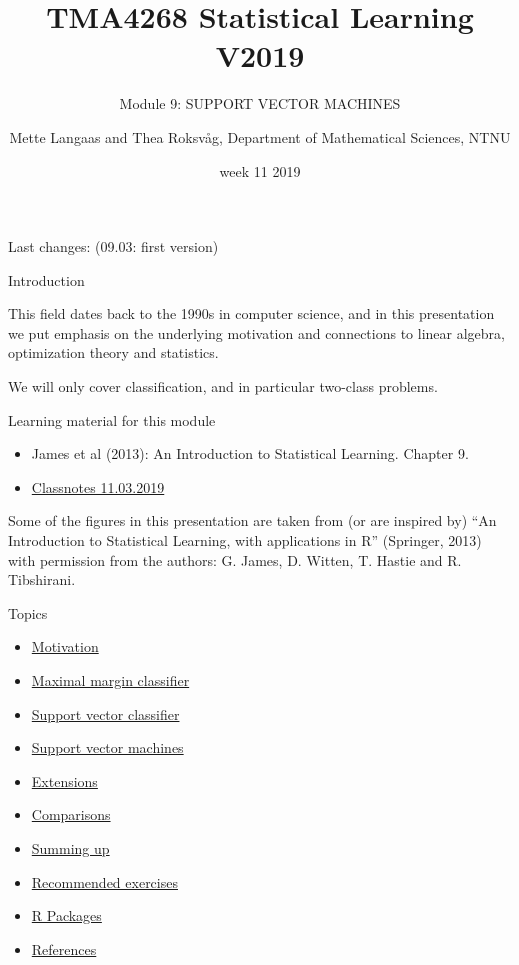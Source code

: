 \documentclass[ignorenonframetext,]{beamer}
\title{TMA4268 Statistical Learning V2019}
\subtitle{Module 9: SUPPORT VECTOR MACHINES}
\author{Mette Langaas and Thea Roksvåg, Department of Mathematical Sciences,
NTNU}
\date{week 11 2019}
\providecommand{\tightlist}{%
  \setlength{\itemsep}{0pt}\setlength{\parskip}{0pt}}
\begin{document}
\frame{\titlepage}

\begin{frame}

Last changes: (09.03: first version)

\end{frame}

\begin{frame}{Introduction}

This field dates back to the 1990s in computer science, and in this
presentation we put emphasis on the underlying motivation and
connections to linear algebra, optimization theory and statistics.

We will only cover classification, and in particular two-class problems.

\begin{block}{Learning material for this module}

\begin{itemize}
\tightlist
\item
  James et al (2013): An Introduction to Statistical Learning. Chapter
  9.\\
\item
  \href{https://www.math.ntnu.no/emner/TMA4268/2019v/notes/M9notes.pdf}{Classnotes
  11.03.2019}
\end{itemize}

Some of the figures in this presentation are taken from (or are inspired
by) ``An Introduction to Statistical Learning, with applications in R''
(Springer, 2013) with permission from the authors: G. James, D. Witten,
T. Hastie and R. Tibshirani.

\end{block}

\end{frame}

\begin{frame}

\begin{block}{Topics}

\begin{itemize}
\tightlist
\item
  \protect\hyperlink{intro}{Motivation}
\item
  \protect\hyperlink{mmc}{Maximal margin classifier}
\item
  \protect\hyperlink{svc}{Support vector classifier}
\item
  \protect\hyperlink{svm}{Support vector machines}
\item
  \protect\hyperlink{ext}{Extensions}
\item
  \protect\hyperlink{comp}{Comparisons}
\item
  \protect\hyperlink{summing}{Summing up}
\item
  \protect\hyperlink{recex}{Recommended exercises}
\item
  \protect\hyperlink{Rpackages}{R Packages}
\item
  \protect\hyperlink{further}{References}
\end{itemize}

\end{block}

\end{frame}
\end{document}
